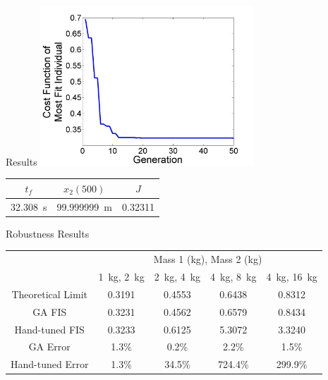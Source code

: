 \documentclass[]{beamer}
\begin{document}
\begin{frame}{Results}
    \centering
    \vspace{2em}
    \includegraphics[width=0.6\textwidth]{media/image38}\\
    \begin{tabular}{|c|c|c|} \hline
        $t_f$ & $x_2(500)$ & $J$ \\\hline
        \SI{32.308}{\second} & \SI{99.999999}{\metre} &  0.32311 \\\hline
    \end{tabular} 
\end{frame}

\begin{frame}{Robustness Results}
    \begin{tabular}{|c|c|c|c|c|} \cline{2-5}
        \multicolumn{1}{c|}{} & \multicolumn{4}{|c|}{Mass 1 (\si{\kilogram}), Mass 2 (\si{\kilogram})} \\\cline{2-5}
        \multicolumn{1}{c|}{} & \SI{1}{\kilogram}, \SI{2}{\kilogram} & \SI{2}{\kilogram}, \SI{4}{\kilogram} & \SI{4}{\kilogram}, \SI{8}{\kilogram} & \SI{4}{\kilogram}, \SI{16}{\kilogram} \\\hline
        Theoretical Limit & 0.3191 & 0.4553 & 0.6438 & 0.8312 \\\hline
        GA FIS & 0.3231 & 0.4562 & 0.6579 & 0.8434 \\\hline
        Hand-tuned FIS & 0.3233 & 0.6125 & 5.3072 & 3.3240 \\\hline\hline
        GA Error & \multicolumn{1}{|d|}{1.3\%} & \multicolumn{1}{|d|}{0.2\%} & \multicolumn{1}{|d|}{2.2\%} & \multicolumn{1}{|d|}{1.5\%} \\\hline
        Hand-tuned Error & \multicolumn{1}{|d|}{1.3\%} & \multicolumn{1}{|d|}{34.5\%} & \multicolumn{1}{|d|}{724.4\%} & \multicolumn{1}{|d|}{299.9\%} \\\hline 
    \end{tabular}
\end{frame}
\end{document}
